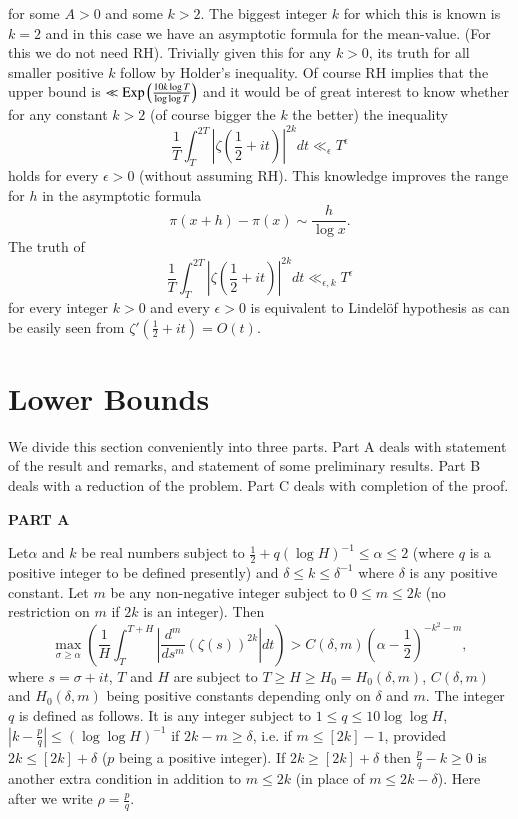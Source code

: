 for some $A>0$ and some $k >2$. The biggest integer $k$ for which this is known is $k=2$ and in this case we have an asymptotic formula for the mean-value. (For this we do not need RH). Trivially given this for any $k>0$, its truth for all smaller positive $k$ follow by Holder's inequality. Of course RH implies that the upper bound is $\ll \operatorname{Exp} \left(\frac{10 k \log T}{\log \log T} \right)$ and it would be of great interest to know whether for any constant $k >2$ (of course bigger the $k$ the better) the inequality
$$
\frac{1}{T} \int^{2T}_T |\zeta(\frac{1}{2} + it)|^{2k} dt \ll_\epsilon T^\epsilon
$$
holds for every $\epsilon > 0$ (without assuming RH). This knowledge improves the range for $h$ in the asymptotic formula
$$
\pi (x + h) - \pi (x) \sim \frac{h}{\log x}.
$$
The truth of 
$$
\frac{1}{T} \int^{2T}_T |\zeta(\frac{1}{2} + it)|^{2k} dt \ll_{\epsilon,k} T^\epsilon
$$
for every integer $k>0$ and every $\epsilon > 0$ is equivalent to Lindel\"of hypothesis as can be easily seen from $\zeta'(\frac{1}{2} + it) = O(t)$.

\section{Lower Bounds}\label{c4:sec4.2}
We divide this section conveniently into three parts. Part A deals with statement of the result and remarks, and statement of some preliminary results. Part B deals with a reduction of the problem. Part C deals with completion of the proof.

\begin{center}
\textbf{PART A}
\end{center}

\begin{theorem}\label{c4:thm4.2.1}
Let\pageoriginale $\alpha$ and $k$ be real numbers subject to $\frac{1}{2} + q (\log H)^{-1} \leq \alpha \leq 2$ (where $q$ is a positive integer to be defined presently) and $\delta \leq k \leq \delta^{-1}$ where $\delta$ is any positive constant. Let $m$ be any non-negative integer subject to $0\leq m \leq 2k$ (no restriction on $m$ if $2k$ is an integer). Then
$$
\max\limits_{\sigma \geq \alpha} \left(\frac{1}{H} \int^{T+H}_T |\frac{d^m}{ds^m} (\zeta(s))^{2k}| dt\right) > C (\delta, m) \left(\alpha - \frac{1}{2}\right)^{-k^2 -m},
$$
where $s = \sigma + it$, $T$ and $H$ are subject to $T \geq H \geq H_0 = H_0(\delta, m) $, $C (\delta , m)$ and $H_0 (\delta, m)$ being positive constants depending only on $\delta$ and $m$. The integer $q$ is defined as follows. It is any integer subject to $1\leq q \leq 10 \log \log H$, $|k-\frac{p}{q}| \leq (\log \log H)^{-1} $ if $2k - m \geq \delta$, i.e. if $m \leq [2k] -1$, provided $2k \leq [2k] + \delta$ ($p$ being a positive integer). If $2k \geq [2k] + \delta$ then $\frac{p}{q} - k \geq 0$ is another extra condition in addition to $m \leq 2k$ (in place of $m \leq 2k -\delta$). Here after we write $\rho = \frac{p}{q}$.
\end{theorem}

